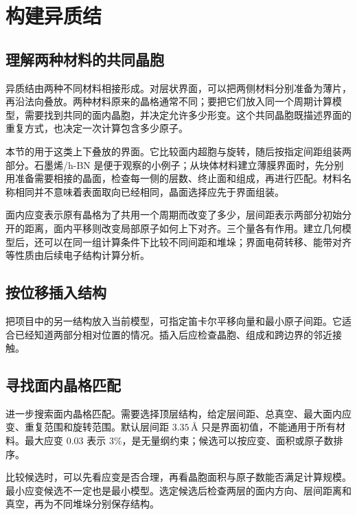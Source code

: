 \section{构建异质结}\label{sec:heterojunction}

\subsection{理解两种材料的共同晶胞}

异质结由两种不同材料相接形成。对层状界面，可以把两侧材料分别准备为薄片，再沿法向叠放。两种材料原来的晶格通常不同；要把它们放入同一个周期计算模型，需要找到共同的面内晶胞，并决定允许多少形变。这个共同晶胞既描述界面的重复方式，也决定一次计算包含多少原子。

本节的用于这类上下叠放的界面。它比较面内超胞与旋转，随后按指定间距组装两部分。石墨烯/h-BN 是便于观察的小例子；从块体材料建立薄膜界面时，先分别用准备需要相接的晶面，检查每一侧的层数、终止面和组成，再进行匹配。材料名称相同并不意味着表面取向已经相同，晶面选择应先于界面组装。

面内应变表示原有晶格为了共用一个周期而改变了多少，层间距表示两部分初始分开的距离，面内平移则改变局部原子如何上下对齐。三个量各有作用。建立几何模型后，还可以在同一组计算条件下比较不同间距和堆垛；界面电荷转移、能带对齐等性质由后续电子结构计算分析。

\subsection{按位移插入结构}

把项目中的另一结构放入当前模型，可指定笛卡尔平移向量和最小原子间距。它适合已经知道两部分相对位置的情况。插入后应检查晶胞、组成和跨边界的邻近接触。

\subsection{寻找面内晶格匹配}

进一步搜索面内晶格匹配。需要选择顶层结构，给定层间距、总真空、最大面内应变、重复范围和旋转范围。默认层间距 $3.35\,\text{\AA}$ 只是界面初值，不能通用于所有材料。最大应变 0.03 表示 3\%，是无量纲约束；候选可以按应变、面积或原子数排序。

比较候选时，可以先看应变是否合理，再看晶胞面积与原子数能否满足计算规模。最小应变候选不一定也是最小模型。选定候选后检查两层的面内方向、层间距离和真空，再为不同堆垛分别保存结构。

